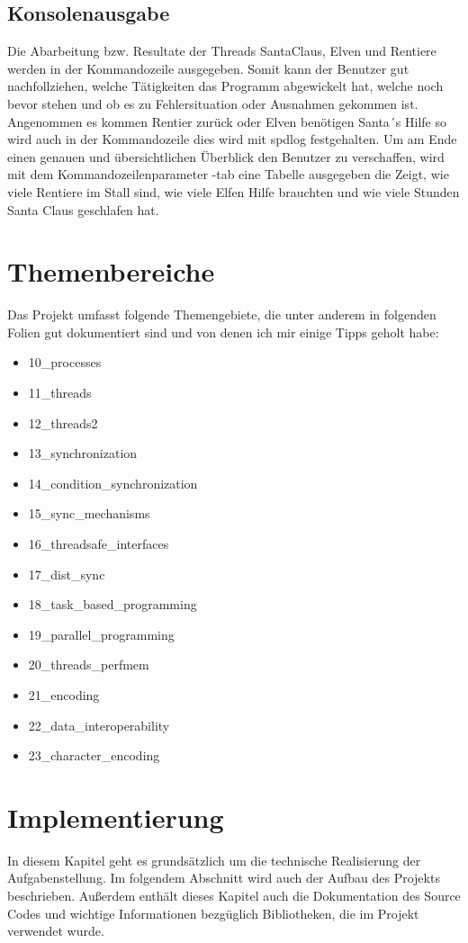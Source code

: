 \documentclass[a4paper,12pt]{exam}
\begin{document}
\subsection{Konsolenausgabe}
Die Abarbeitung bzw. Resultate der Threads SantaClaus, Elven und Rentiere werden in der Kommandozeile ausgegeben. Somit kann der Benutzer gut nachfollziehen, welche Tätigkeiten das Programm abgewickelt hat, welche noch bevor stehen und
ob es zu Fehlersituation oder Ausnahmen gekommen ist. Angenommen es kommen Rentier zurück oder Elven benötigen Santa´s Hilfe so wird auch in der Kommandozeile dies wird mit spdlog festgehalten. Um am Ende einen genauen und übersichtlichen 
Überblick den Benutzer zu verschaffen, wird mit dem Kommandozeilenparameter -tab eine Tabelle ausgegeben die Zeigt, wie viele Rentiere im Stall sind, wie viele Elfen Hilfe brauchten und wie viele Stunden Santa Claus geschlafen hat.
\newpage

\section{Themenbereiche}
Das Projekt umfasst folgende Themengebiete, die unter anderem in folgenden Folien gut dokumentiert sind und von denen ich mir einige Tipps geholt habe:
    \begin{itemize}
        \item  10\_processes
        \item  11\_threads
        \item  12\_threads2 
        \item  13\_synchronization 
        \item  14\_condition\_synchronization 
        \item  15\_sync\_mechanisms 
        \item  16\_threadsafe\_interfaces 
        \item  17\_dist\_sync 
        \item  18\_task\_based\_programming 
        \item  19\_parallel\_programming 
        \item  20\_threads\_perfmem
        \item  21\_encoding
        \item  22\_data\_interoperability
        \item  23\_character\_encoding
    \end{itemize} 
\newpage
\section{Implementierung}
In diesem Kapitel geht es grundsätzlich um die technische Realisierung der Aufgabenstellung. Im folgendem Abschnitt wird auch
der Aufbau des Projekts beschrieben. Außerdem enthält dieses Kapitel auch die Dokumentation des Source Codes und wichtige Informationen bezgüglich Bibliotheken, 
die im Projekt verwendet wurde. 
\end{document}
